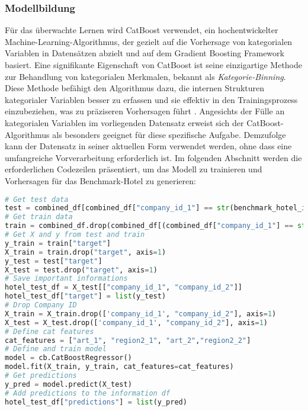 \subsubsection{Modellbildung}
\label{subsubsec:learn_model}
Für das überwachte Lernen wird CatBoost verwendet, ein hochentwickelter Machine-Learning-Algorithmus, der gezielt auf die Vorhersage von kategorialen Variablen in Datensätzen abzielt und auf dem Gradient Boosting Framework basiert. Eine signifikante Eigenschaft von CatBoost ist seine einzigartige Methode zur Behandlung von kategorialen Merkmalen, bekannt als \emph{Kategorie-Binning}. Diese Methode befähigt den Algorithmus dazu, die internen Strukturen kategorialer Variablen besser zu erfassen und sie effektiv in den Trainingsprozess einzubeziehen, was zu präziseren Vorhersagen führt \cite{Hancock.2020}.
\newline
\newline
Angesichts der Fülle an kategorialen Variablen im vorliegenden Datensatz erweist sich der CatBoost-Algorithmus als besonders geeignet für diese spezifische Aufgabe. Demzufolge kann der Datensatz in seiner aktuellen Form verwendet werden, ohne dass eine umfangreiche Vorverarbeitung erforderlich ist.
\newline
\newline
Im folgenden Abschnitt werden die erforderlichen Codezeilen präsentiert, um das Modell zu trainieren und Vorhersagen für das Benchmark-Hotel zu generieren:

\begin{lstlisting}[language=Python, label=lst:learn_model_train, caption=Erzeugung der Vorhersagen von ähnlichen Hotels mittels CatBoost]
# Get test data
test = combined_df[combined_df["company_id_1"] == str(benchmark_hotel_id)]
# Get train data
train = combined_df.drop(combined_df[(combined_df["company_id_1"] == str(benchmark_hotel_id)) | (combined_df["company_id_2"] == str(benchmark_hotel_id))].index)
# Get X and y from test and train
y_train = train["target"]
X_train = train.drop("target", axis=1)
y_test = test["target"]
X_test = test.drop("target", axis=1)
# Save important informations
hotel_test_df = X_test[["company_id_1", "company_id_2"]]
hotel_test_df["target"] = list(y_test)
# Drop Company ID
X_train = X_train.drop(['company_id_1', "company_id_2"], axis=1)
X_test = X_test.drop(['company_id_1', "company_id_2"], axis=1)
# Define cat features 
cat_features = ["art_1", "region2_1", "art_2","region2_2"]
# Define and train model 
model = cb.CatBoostRegressor()
model.fit(X_train, y_train, cat_features=cat_features)
# Get predictions 
y_pred = model.predict(X_test)
# Add predictions to the information df
hotel_test_df["predictions"] = list(y_pred)
\end{lstlisting}

